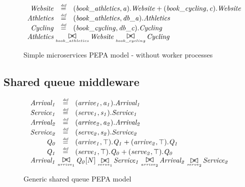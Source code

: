 \begin{figure}
	\caption{Simple microservices PEPA model - without worker processes}
	\centering
\begin{displaymath}
\begin{array}{rcl}
		\mathit{Website} & \rmdef & (\mathit{book\_athletics},\mathit{a}).\mathit{Website}+(\mathit{book\_cycling},\mathit{c}).\mathit{Website}\\
\mathit{Athletics} & \rmdef & (\mathit{book\_athletics},\mathit{db\_a}).\mathit{Athletics}\\
\mathit{Cycling} & \rmdef & (\mathit{book\_cycling},\mathit{db\_c}).\mathit{Cycling}\\
[0.0ex]		\multicolumn{3}{l}{\mathit{Athletics}\sync{book\_athletics}\mathit{Website}\sync{book\_cycling}\mathit{Cycling}}\\
[0.0ex]	\end{array}
\end{displaymath}
\end{figure}

%
%
\subsection{Shared queue middleware}

\begin{figure}
	\caption{Generic shared queue PEPA model}
	\centering
	\begin{displaymath}
		\begin{array}{rcl}
			\mathit{Arrival_1} & \rmdef & (\mathit{arrive_1},\mathit{a_1}).\mathit{Arrival_1}\\
			\mathit{Service_1} & \rmdef & (\mathit{serve_1},\mathit{s_1}).\mathit{Service_1}\\
			\mathit{Arrival_2} & \rmdef & (\mathit{arrive_2},\mathit{a_2}).\mathit{Arrival_2}\\
			\mathit{Service_2} & \rmdef & (\mathit{serve_2},\mathit{s_2}).\mathit{Service_2}\\
			\mathit{Q_0} & \rmdef & (\mathit{arrive_1},\top).\mathit{Q_1}+(\mathit{arrive_2},\top).\mathit{Q_1}\\
			\mathit{Q_1} & \rmdef & (\mathit{serve_1},\top).\mathit{Q_0}+(\mathit{serve_2},\top).\mathit{Q_0}\\
	[0.0ex]		\multicolumn{3}{l}{\mathit{Arrival_1}\sync{arrive_1}\mathit{Q_0}[N]\sync{serve_1}\mathit{Service_1}\sync{arrive_2}\mathit{Arrival_2}\sync{serve_2}\mathit{Service_2}}\\
	[0.0ex]	\end{array}
	\end{displaymath}
\end{figure}

